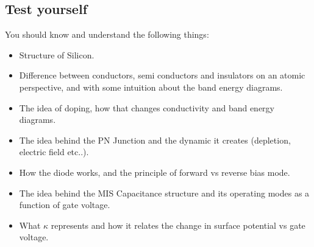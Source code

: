 \subsection{Test yourself}
You should know and understand the following things: 
\begin{itemize}
    \item Structure of Silicon.
    \item Difference between conductors, semi conductors and insulators on an atomic perspective, and with some intuition about the band energy diagrams.
    \item The idea of doping, how that changes conductivity and band energy diagrams.
    \item The idea behind the PN Junction and the dynamic it creates (depletion, electric field etc..).
    \item How the diode works, and the principle of forward vs reverse bias mode. 
    \item The idea behind the MIS Capacitance structure and its operating modes as a function of gate voltage.
    \item What $\kappa$ represents and how it relates the change in surface potential vs gate voltage. 
\end{itemize}